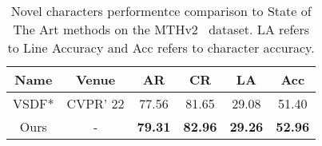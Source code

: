 \begin{table}[]
    \centering
    \caption{Novel characters  performentce comparison to State of The Art methods on the MTHv2~\cite{jla} dataset. LA refers to Line Accuracy and Acc refers to character accuracy.}
    \begin{tabular}{c|c|c|ccc}
        \hline
         Name & Venue & AR & CR & LA & Acc \\
         \hline
         VSDF*\cite{vsdf}& CVPR' 22  &77.56 &81.65 &29.08 & 51.40 \\
         \hline
         Ours&- & \textbf{79.31} &\textbf{82.96}  & \textbf{29.26} & \textbf{52.96} \\
        \hline
    \end{tabular}
    \label{tab:zero_shot}
\end{table}